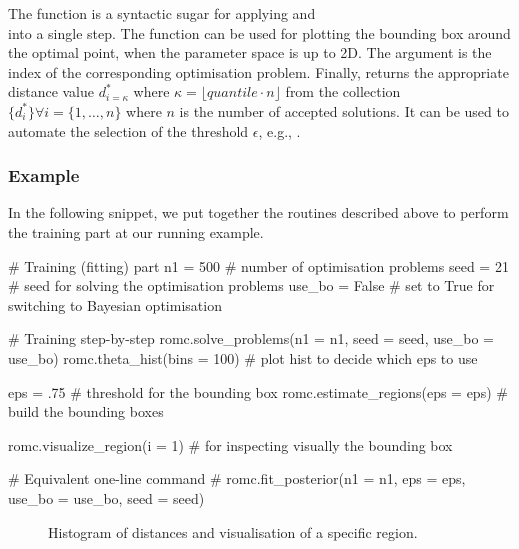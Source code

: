 \noindent
The function  is a syntactic sugar for applying
 and \\  into a single
step. The function  can be used for plotting
the bounding box around the optimal point, when the parameter space is
up to 2D. The argument  is the index of the corresponding
optimisation problem. Finally,  returns the
appropriate distance value \(d_{i=\kappa}^*\) where
\(\kappa = \lfloor quantile \cdot n \rfloor\) from the collection
\(\{ d_i^* \} \forall i = \{1, \ldots, n\}\) where \(n\) is the number
of accepted solutions. It can be used to automate the selection of the
threshold \(\epsilon\), e.g.,
.


\subsubsection*{Example}


In the following snippet, we put together the routines described above
to perform the training part at our running example.

\begin{Code}
# Training (fitting) part
n1 = 500 # number of optimisation problems
seed = 21 # seed for solving the optimisation problems
use_bo = False # set to True for switching to Bayesian optimisation

# Training step-by-step
romc.solve_problems(n1 = n1, seed = seed, use_bo = use_bo)
romc.theta_hist(bins = 100) # plot hist to decide which eps to use

eps = .75 # threshold for the bounding box 
romc.estimate_regions(eps = eps) # build the bounding boxes

romc.visualize_region(i = 1) # for inspecting visually the bounding box

# Equivalent one-line command
# romc.fit_posterior(n1 = n1, eps = eps, use_bo = use_bo, seed = seed)
\end{Code}

\begin{figure}[ht]
  \begin{center}    
    
    
  \end{center}
  \caption[Histogram of distances at the one-dimensional example.]{Histogram of
    distances and visualisation of a specific region.}
  \label{fig:running_example_romc_inference}
\end{figure}
